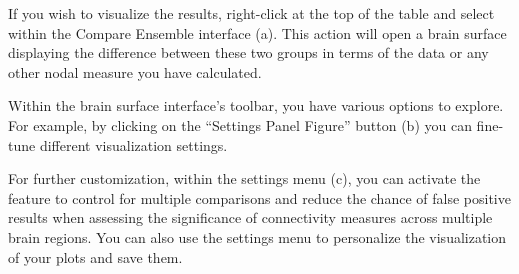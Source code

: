 \documentclass[justified]{tufte-handout}
\begin{document}
 
If you wish to visualize the results, right-click at the top of the table and select  within the Compare Ensemble interface (a). This action will open a brain surface displaying the difference between these two groups in terms of the  data or any other nodal measure you have calculated.

Within the brain surface interface's toolbar, you have various options to explore. For example, by clicking on the “Settings Panel Figure” button (b) you can fine-tune different visualization settings.

For further customization, within the settings menu (c), you can activate the  feature to control for multiple comparisons and reduce the chance of false positive results when assessing the significance of connectivity measures across multiple brain regions. You can also use the settings menu to personalize the visualization of your plots and save them.
\end{document}
